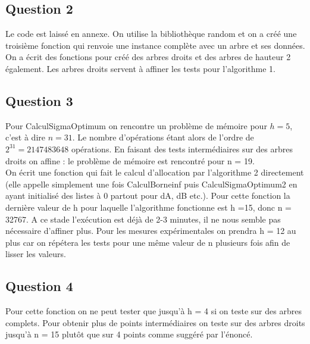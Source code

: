 \documentclass{article}
\begin{document}
\subsection{Question 2}
Le code est laissé en annexe. On utilise la bibliothèque random et on a créé une troisième fonction qui renvoie une instance complète avec un arbre et ses données. On a écrit des fonctions pour créé des arbres droits et des arbres de hauteur 2 également. Les arbres droits servent à affiner les tests pour l'algorithme 1.
\subsection{Question 3}
Pour CalculSigmaOptimum on rencontre un problème de mémoire pour $h = 5$, c'est à dire $n = 31$. Le nombre d'opérations étant alors de l'ordre de $2^{31} = 2147483648$ opérations. En faisant des tests intermédiaires sur des arbres droits on affine : le problème de mémoire est rencontré pour n = 19. \\
On écrit une fonction qui fait le calcul d'allocation par l'algorithme 2 directement (elle appelle simplement une fois CalculBorneinf puis CalculSigmaOptimum2 en ayant initialisé des listes à 0 partout pour dA, dB etc.).
Pour cette fonction la dernière valeur de h pour laquelle l'algorithme fonctionne est h =15, donc n = 32767. A ce stade l'exécution est déjà de 2-3 minutes, il ne nous semble pas nécessaire d'affiner plus. Pour les mesures expérimentales on prendra h = 12 au plus car on répétera les tests pour une même valeur de n plusieurs fois afin de lisser les valeurs.

\subsection{Question 4}
Pour cette fonction on ne peut tester que jusqu'à h = 4 si on teste sur des arbres complets. 
Pour obtenir plus de points intermédiaires on teste sur des arbres droits jusqu'à n = 15 plutôt que sur 4 points comme suggéré par l'énoncé.
\end{document}
